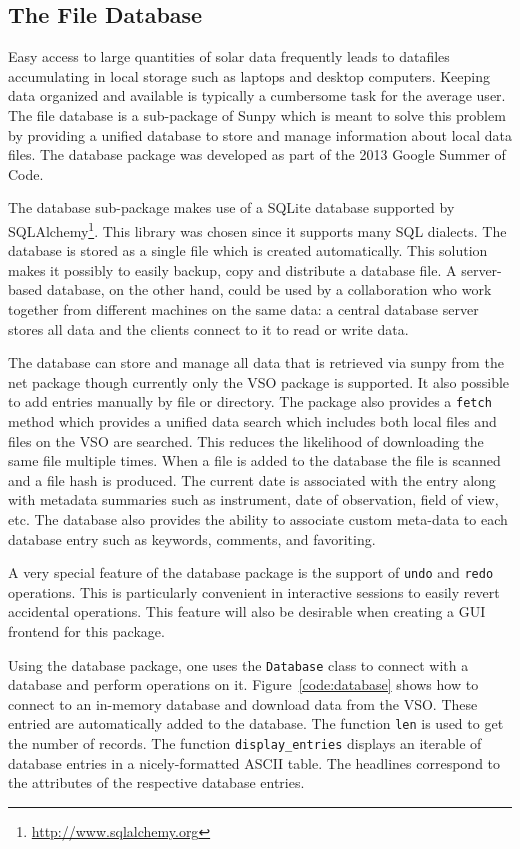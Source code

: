 \subsection{The File Database}
Easy access to large quantities of solar data frequently leads to datafiles accumulating
in local storage such as laptops and desktop computers. Keeping data organized and available
is typically a cumbersome task for the average user. The file database is a sub-package of 
Sunpy which is meant to solve this problem by providing a unified database to store and manage information about 
local data files. The database package was developed as part of the 2013 
Google Summer of Code. 

The database sub-package makes use of a SQLite database supported by  
SQLAlchemy\footnote{\url{http://www.sqlalchemy.org}}. This library was chosen
since it supports many SQL dialects. The database is stored as a single file which is 
created automatically. This solution makes it possibly to easily backup, copy and distribute
a database file. A server-based database, on the other hand, could be used by a collaboration 
who work together from different machines on the
same data: a central database server stores all data and the clients connect to
it to read or write data.

The database can store and manage all data that is retrieved via sunpy from the net
package though currently only the \textsc{VSO} package is supported. 
It also possible to add entries manually by file or directory. The package also provides
a \texttt{fetch} method which provides a unified data search which includes both local files
and files on the \textsc{VSO} are searched. This reduces the likelihood of downloading the same file 
multiple times. When a file is added to the database the file is scanned and a file hash is produced. 
The current date is associated with the entry along with metadata summaries such 
as instrument, date of observation, field of view, etc. 
The database also provides the ability to associate custom meta-data to 
each database entry such as keywords, comments, and favoriting.

A very special feature of the database package is the support of \texttt{undo}
and \texttt{redo} operations. This is particularly convenient in
interactive sessions to easily revert accidental operations. 
This feature will also be desirable when creating a GUI frontend for this package.

Using the database package, one uses the \texttt{Database} class to connect
with a database and perform operations on it. Figure~\ref{code:database} shows how to connect
to an in-memory database and download data from the \textsc{VSO}. These entried are
automatically added to the database. The function \texttt{len} is used to get the number of
records. The function \texttt{display\_entries} displays an iterable of database entries
in a nicely-formatted \textsc{ASCII} table. The headlines correspond to the
attributes of the respective database entries.

